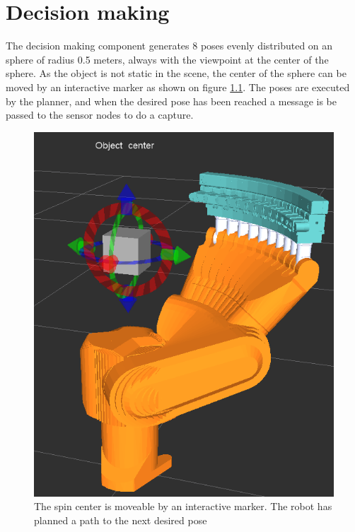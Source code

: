 \chapter{Decision making}
The decision making component generates 8 poses evenly distributed on an sphere of radius 0.5 meters, always with the viewpoint at the center of the sphere. As the object is not static in the scene, the center of the sphere can be moved by an interactive marker as shown on figure \ref{fig:robot_moving_around_object}. The poses are executed by the planner, and when the desired pose has been reached a message is be passed to the sensor nodes to do a capture.


\begin{figure}[htb]
	\begin{center}
		\includegraphics[scale=0.5,trim=0 0 0 0]{graphics/04_decisionmaking/robot_moving_around_object.png}%
		\caption{The spin center is moveable by an interactive marker. The robot has planned a path to the next desired pose}
		\label{fig:robot_moving_around_object}
	\end{center}
\end{figure}

